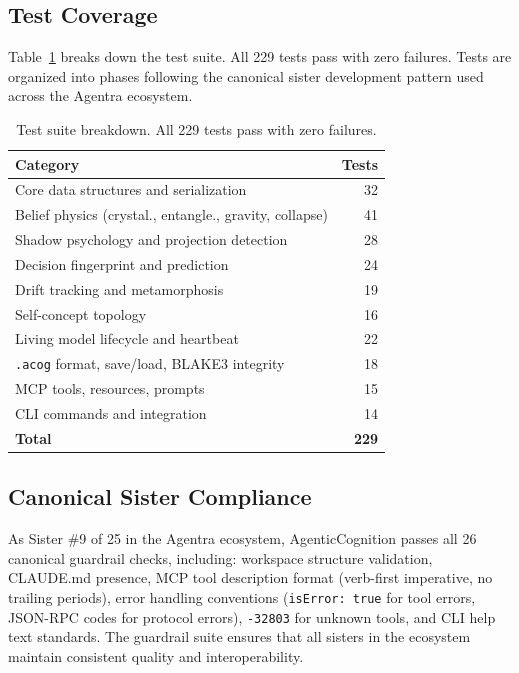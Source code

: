 \documentclass[10pt, twocolumn]{article}
\begin{document}
\subsection{Test Coverage}
\label{sec:tests}

Table~\ref{tab:tests} breaks down the test suite. All 229 tests pass with zero failures. Tests are organized into phases following the canonical sister development pattern used across the Agentra ecosystem.

\begin{table}[t]
\centering
\caption{Test suite breakdown. All 229 tests pass with zero failures.}
\label{tab:tests}
\footnotesize
\begin{tabular}{lr}
\toprule
\textbf{Category} & \textbf{Tests} \\
\midrule
Core data structures and serialization & 32 \\
Belief physics (crystal., entangle., gravity, collapse) & 41 \\
Shadow psychology and projection detection & 28 \\
Decision fingerprint and prediction & 24 \\
Drift tracking and metamorphosis & 19 \\
Self-concept topology & 16 \\
Living model lifecycle and heartbeat & 22 \\
\texttt{.acog} format, save/load, BLAKE3 integrity & 18 \\
MCP tools, resources, prompts & 15 \\
CLI commands and integration & 14 \\
\midrule
\textbf{Total} & \textbf{229} \\
\bottomrule
\end{tabular}
\end{table}

\subsection{Canonical Sister Compliance}
\label{sec:compliance}

As Sister \#9 of 25 in the Agentra ecosystem, AgenticCognition passes all 26 canonical guardrail checks, including: workspace structure validation, CLAUDE.md presence, MCP tool description format (verb-first imperative, no trailing periods), error handling conventions (\texttt{isError: true} for tool errors, JSON-RPC codes for protocol errors), \texttt{-32803} for unknown tools, and CLI help text standards. The guardrail suite ensures that all sisters in the ecosystem maintain consistent quality and interoperability.
\end{document}
